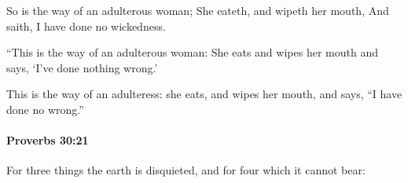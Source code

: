 			\begin{versebox}
					\item[BHS] 
					\item[ASV] So is the way of an adulterous woman; She eateth, and wipeth her mouth, And saith, I have done no wickedness.
					\item[NIV] “This is the way of an adulterous woman: She eats and wipes her mouth and says, ‘I’ve done nothing wrong.’
					\item[NRSV] This is the way of an adulteress: she eats, and wipes her mouth, and says, “I have done no wrong.”
			\end{versebox}

		\paragraph{Proverbs 30:21} %
			\label{PROVERBS-30-21}

			For three things the earth is disquieted, and for four which it cannot bear:

